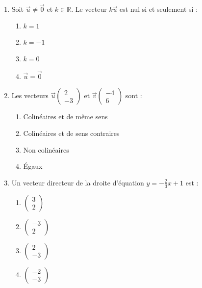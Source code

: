 \documentclass[11pt]{article}
\begin{document}
\begin{exercice}
\begin{enumerate}
    \item Soit $\vec{u} \neq \vec{0}$ et $k \in \mathbb{R}$. Le vecteur $k\vec{u}$ est nul si et seulement si :
    \begin{enumerate}
        \item $k = 1$
        \item $k = -1$
        \item $k = 0$
        \item $\vec{u} = \vec{0}$
    \end{enumerate}
    \item Les vecteurs $\vec{u}\begin{pmatrix} 2 \\ -3 \end{pmatrix}$ et $\vec{v}\begin{pmatrix} -4 \\ 6 \end{pmatrix}$ sont :
    \begin{enumerate}
        \item Colinéaires et de même sens
        \item Colinéaires et de sens contraires
        \item Non colinéaires
        \item Égaux
    \end{enumerate}
    \item Un vecteur directeur de la droite d'équation $y = -\frac{2}{3}x + 1$ est :
    \begin{enumerate}
        \item $\begin{pmatrix} 3 \\ 2 \end{pmatrix}$
        \item $\begin{pmatrix} -3 \\ 2 \end{pmatrix}$
        \item $\begin{pmatrix} 2 \\ -3 \end{pmatrix}$
        \item $\begin{pmatrix} -2 \\ -3 \end{pmatrix}$
    \end{enumerate}
\end{enumerate}
\end{exercice}
\end{document}
